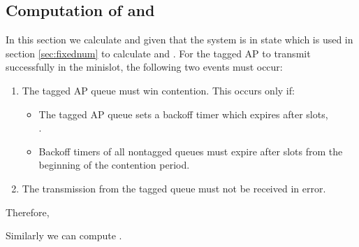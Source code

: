 \documentclass[10pt,conference]{IEEEtran}
\begin{document}
\subsection{Computation of  and }
\label{app_oppsched4}
In this section we calculate  and  given that the system is in state  which is used in section \ref{sec:fixednum} to calculate  and .
For the tagged AP to transmit successfully in the minislot, the following two events must occur:
\begin{enumerate}
 \item The tagged  AP queue must win contention. This occurs only if:
 \begin{itemize}
  \item The tagged AP queue sets a backoff timer which expires after  slots, \\
     . 
 \item Backoff timers of all nontagged queues must expire after  slots from the beginning of the contention period. 
 \end{itemize}
 \item The transmission from the tagged queue must not be received in error.
\end{enumerate}

Therefore,



Similarly we can compute .




\end{document}
